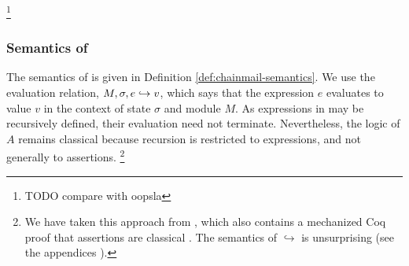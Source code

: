 \footnote{{TODO compare with oopsla }}


\subsubsection{Semantics of \AssertLang}
The semantics of \AssertLang   
is given in Definition \ref{def:chainmail-semantics}. 
We   use the evaluation relation, $M, \sigma, e \hookrightarrow v$,
which says that the expression $e$ evaluates
to value $v$ in the context of state $\sigma$ and module $M$.
As expressions in \LangOO may be recursively defined, their evaluation 
need not   %
 terminate. Nevertheless, the logic of $A$ remains classical because recursion is restricted
to expressions, and not generally to assertions.
\footnote{We have taken this approach from , which also contains a mechanized Coq proof that assertions are classical \cite{coqFASE}.
The semantics of $\hookrightarrow$ {is} unsurprising 
(see {the appendices %
\cite{necessityFull}).} } %



